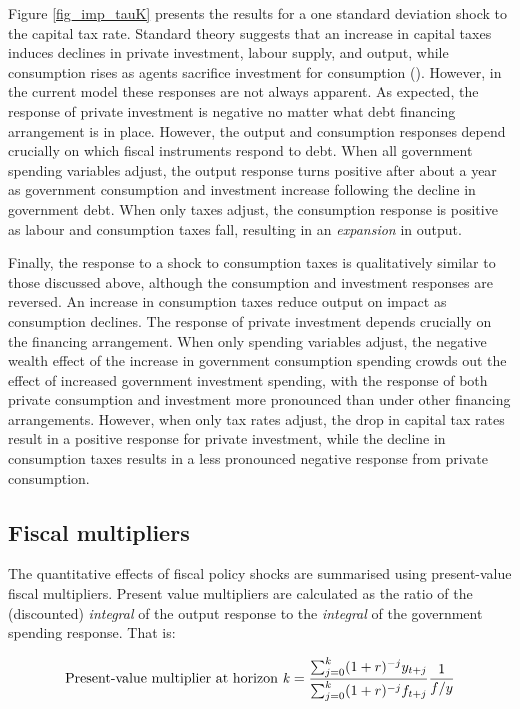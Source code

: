 \documentclass[a4paper,11pt]{article}
\numberwithin{equation}{section}
\begin{document}
	Figure \ref{fig_imp_tauK} presents the results for a one standard deviation shock to the capital tax rate. Standard theory suggests that an increase in capital taxes induces declines in private investment, labour supply, and output, while consumption rises as agents sacrifice investment for consumption (\citealp{leeper2010}). However, in the current model these responses are not always apparent. As expected, the response of private investment is negative no matter what debt financing arrangement is in place. However, the output and consumption responses depend crucially on which fiscal instruments respond to debt. When all government spending variables adjust, the output response turns positive after about a year as government consumption and investment increase following the decline in government debt. When only taxes adjust, the consumption response is positive as labour and consumption taxes fall, resulting in an \textit{expansion} in output.  
	
	Finally, the response to a shock to consumption taxes is qualitatively similar to those discussed above, although the consumption and investment responses are reversed. An increase in consumption taxes reduce output on impact as consumption declines. The response of private investment depends crucially on the financing arrangement. When only spending variables adjust, the negative wealth effect of the increase in government consumption spending crowds out the effect of increased government investment spending, with the response of both private consumption and investment more pronounced than under other financing arrangements. However, when only tax rates adjust, the drop in capital tax rates result in a positive response for private investment, while the decline in consumption taxes results in a less pronounced negative response from private consumption. 
	
	\subsection{Fiscal multipliers}
	
	The quantitative effects of fiscal policy shocks are summarised using present-value fiscal multipliers. Present value multipliers are calculated as the ratio of the (discounted) \textit{integral} of the output response to the \textit{integral} of the government spending response. That is:
	
	\begin{equation}
	\text{Present-value multiplier at horizon \textit{k}} = \frac{\sum_{j=0}^{k}(1+r)^{-j}y_{t+j}}{\sum_{j=0}^{k}(1+r)^{-j}f_{t+j}}\frac{1}{f/y}
	\end{equation}
	
\end{document}
